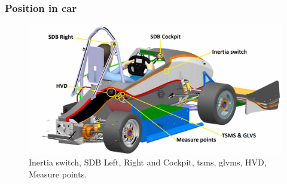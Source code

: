 \subsubsection{Position in car}

\begin{figure}[H]
	\includegraphics[width=\textwidth]{./img/car-pos.jpg}
	\caption{Inertia switch, SDB Left, Right and Cockpit, \gls{tsms}, \gls{glvms}, HVD, Measure points.}
	\label{fig:SDC-positionInCar}
\end{figure}
